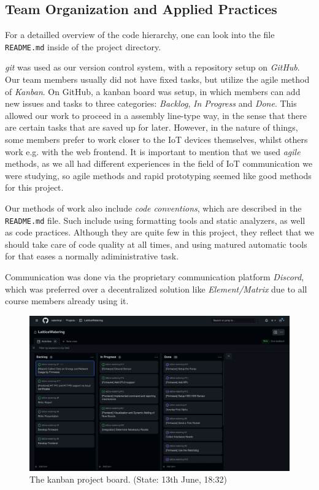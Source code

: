 \documentclass[acmtog, language=english, nonacm]{acmart}
\begin{document}
    \subsection{Team Organization and Applied Practices}

    For a detailled overview of the code hierarchy, one can look into the file \texttt{README.md} inside of the project directory.
    
    \emph{git} was used as our version control system, with a repository setup on \emph{GitHub}. Our team members usually did not have fixed tasks, but utilize the agile method of \emph{Kanban}. On GitHub, a kanban board was setup, in which members can add new issues and tasks to three categories: \emph{Backlog}, \emph{In Progress} and \emph{Done}. This allowed our work to proceed in a assembly line-type way, in the sense that there are certain tasks that are saved up for later. However, in the nature of things, some members prefer to work closer to the IoT devices themselves, whilst others work e.g. with the web frontend. It is important to mention that we used \emph{agile} methods, as we all had different experiences in the field of IoT communication we were studying, so agile methods and rapid prototyping seemed like good methods for this project.

    Our methods of work also include \emph{code conventions}, which are described in the \texttt{README.md} file. Such include using formatting tools and static analyzers, as well as code practices. Although they are quite few in this project, they reflect that we should take care of code quality at all times, and using matured automatic tools for that eases a normally adiministrative task.

    Communication was done via the proprietary communication platform \emph{Discord}, which was preferred over a decentralized solution like \emph{Element/Matrix} due to all course members already using it.

    \begin{figure}[!hbtp]
        \centering
        \includegraphics[width=\linewidth]{img/kanban_board.png}
        \caption{The kanban project board. (State: 13th June, 18:32)}
    \end{figure}
\end{document}
